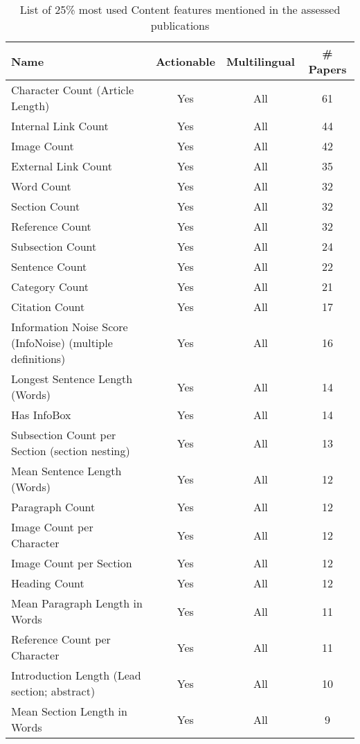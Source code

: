 \begin{table}[htbp]
    \caption{List of 25\% most used Content features mentioned in the assessed publications}
    \label{tab:feat_Content}
    \centering
    \begin{tabular}{m{} c c c}
        \toprule
        \textbf{Name} & \textbf{Actionable} & \textbf{Multilingual} & \textbf{\# Papers} \\ 
        \midrule
        Character Count (Article Length) & Yes & All & 61 \\
        Internal Link Count & Yes & All & 44 \\
        Image Count & Yes & All & 42 \\
        External Link Count & Yes & All & 35 \\
        Word Count & Yes & All & 32 \\
        Section Count & Yes & All & 32 \\
        Reference Count & Yes & All & 32 \\
        Subsection Count & Yes & All & 24 \\
        Sentence Count & Yes & All & 22 \\
        Category Count & Yes & All & 21 \\
        Citation Count & Yes & All & 17 \\
        Information Noise Score (InfoNoise) (multiple definitions) & Yes & All & 16 \\
        Longest Sentence Length (Words) & Yes & All & 14 \\
        Has InfoBox & Yes & All & 14 \\
        Subsection Count per Section (section nesting) & Yes & All & 13 \\
        Mean Sentence Length (Words) & Yes & All & 12 \\
        Paragraph Count & Yes & All & 12 \\
        Image Count per Character & Yes & All & 12 \\
        Image Count per Section & Yes & All & 12 \\
        Heading Count & Yes & All & 12 \\
        Mean Paragraph Length in Words & Yes & All & 11 \\
        Reference Count per Character & Yes & All & 11 \\
        Introduction Length (Lead section; abstract) & Yes & All & 10 \\
        Mean Section Length in Words & Yes & All & 9 \\

\end{tabular}
\end{table}
